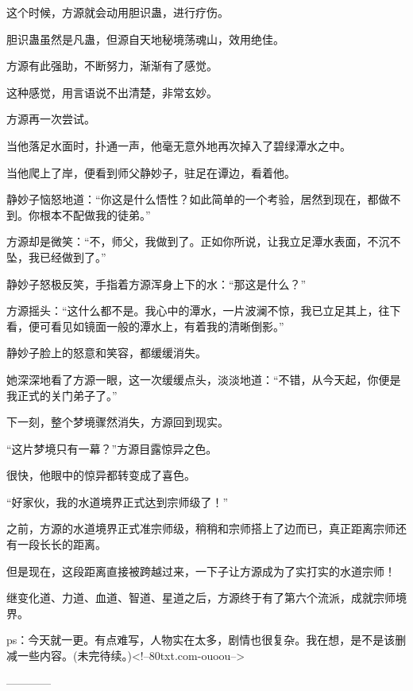 \begin{this_body}
这个时候，方源就会动用胆识蛊，进行疗伤。

胆识蛊虽然是凡蛊，但源自天地秘境荡魂山，效用绝佳。

方源有此强助，不断努力，渐渐有了感觉。

这种感觉，用言语说不出清楚，非常玄妙。

方源再一次尝试。

当他落足水面时，扑通一声，他毫无意外地再次掉入了碧绿潭水之中。

当他爬上了岸，便看到师父静妙子，驻足在谭边，看着他。

静妙子恼怒地道：“你这是什么悟性？如此简单的一个考验，居然到现在，都做不到。你根本不配做我的徒弟。”

方源却是微笑：“不，师父，我做到了。正如你所说，让我立足潭水表面，不沉不坠，我已经做到了。”

静妙子怒极反笑，手指着方源浑身上下的水：“那这是什么？”

方源摇头：“这什么都不是。我心中的潭水，一片波澜不惊，我已立足其上，往下看，便可看见如镜面一般的潭水上，有着我的清晰倒影。”

静妙子脸上的怒意和笑容，都缓缓消失。

她深深地看了方源一眼，这一次缓缓点头，淡淡地道：“不错，从今天起，你便是我正式的关门弟子了。”

下一刻，整个梦境骤然消失，方源回到现实。

“这片梦境只有一幕？”方源目露惊异之色。

很快，他眼中的惊异都转变成了喜色。

“好家伙，我的水道境界正式达到宗师级了！”

之前，方源的水道境界正式准宗师级，稍稍和宗师搭上了边而已，真正距离宗师还有一段长长的距离。

但是现在，这段距离直接被跨越过来，一下子让方源成为了实打实的水道宗师！

继变化道、力道、血道、智道、星道之后，方源终于有了第六个流派，成就宗师境界。

ps：今天就一更。有点难写，人物实在太多，剧情也很复杂。我在想，是不是该删减一些内容。(未完待续。)<!--80txt.com-ouoou-->

------------

\end{this_body}

